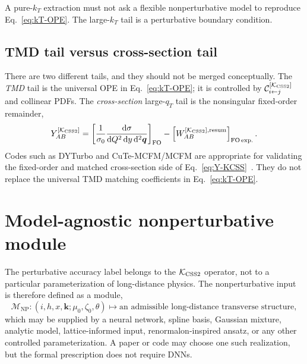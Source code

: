 \documentclass[11pt]{article}
\newcommand{\bk}{\bm{k}}
\newcommand{\bq}{\bm{q}}
\newcommand{\dd}{\mathrm{d}}
\newcommand{\NP}{\mathrm{NP}}
\newcommand{\FO}{\mathrm{FO}}
\newcommand{\KCSS}{\mathcal K_{\rm CSS2}}
\begin{document}
A pure-$k_T$ extraction must not ask a flexible nonperturbative model to reproduce
Eq.~\eqref{eq:kT-OPE}. The large-$k_T$ tail is a perturbative boundary condition.

\subsection{TMD tail versus cross-section tail}

There are two different tails, and they should not be merged conceptually. The
\emph{TMD} tail is the universal OPE in Eq.~\eqref{eq:kT-OPE}; it is controlled by
$\mathcal C_{i\leftarrow j}^{[\KCSS]}$ and collinear PDFs. The \emph{cross-section}
large-$q_T$ tail is the nonsingular fixed-order remainder,
\begin{equation}
  Y_{AB}^{[\KCSS]}
  =
  \left[\frac{1}{\sigma_0}\frac{\dd\sigma}{\dd Q^2\,\dd y\,\dd^2\bq}\right]_{\FO}
  -
  \left[W_{AB}^{[\KCSS],\mathrm{resum}}\right]_{\FO\,\mathrm{exp.}}.
  \label{eq:Y-KCSS}
\end{equation}
Codes such as DYTurbo and CuTe-MCFM/MCFM are appropriate for validating the
fixed-order and matched cross-section side of Eq.~\eqref{eq:Y-KCSS}~\cite{CamardaEtAlDYTurbo2020,CamardaCieriFerrera2021,NeumannCampbell2023}.
They do not replace the universal TMD matching coefficients in Eq.~\eqref{eq:kT-OPE}.


\section{Model-agnostic nonperturbative module}
\label{sec:np-module-final}

The perturbative accuracy label belongs to the $\KCSS$ operator, not to a particular
parameterization of long-distance physics.  The nonperturbative input is therefore defined
as a module,
\begin{equation}
  \mathcal M_{\NP}:
  (i,h,x,\bk;\mu_0,\zeta_0,\theta)
  \longmapsto
  \text{an admissible long-distance transverse structure},
  \label{eq:NP-module-map}
\end{equation}
which may be supplied by a neural network, spline basis, Gaussian mixture, analytic model,
lattice-informed input, renormalon-inspired ansatz, or any other controlled
parameterization.  A paper or code may choose one such realization, but the formal
prescription does not require DNNs.
\end{document}
